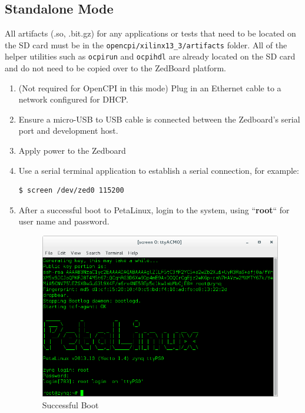 \pagebreak
\subsection{Standalone Mode}
All artifacts (.so, .bit.gz) for any applications or tests that need to be located on the SD card must be in the \texttt{opencpi/xilinx13\_3/artifacts} folder.  All of the helper utilities such as \texttt{ocpirun} and \texttt{ocpihdl} are already located on the SD card and do not need to be copied over to the ZedBoard platform.

\begin{enumerate}
\item (Not required for OpenCPI in this mode) Plug in an Ethernet cable to a network configured for DHCP.
\item Ensure a micro-USB to USB cable is connected between the Zedboard's serial port and development host.
\item Apply power to the Zedboard
\item Use a serial terminal application to establish a serial connection, for example:

\begin{verbatim}
$ screen /dev/zed0 115200
\end{verbatim} \medskip

\item After a successful boot to PetaLinux, login to the system, using  ``\textbf{root}`` for user name and password.

\begin{figure}[H]
	\centerline{\includegraphics[scale=0.5]{zed_boot}}
	\caption{Successful Boot}
	\label{fig:boot2}
\end{figure}


\end{enumerate}
